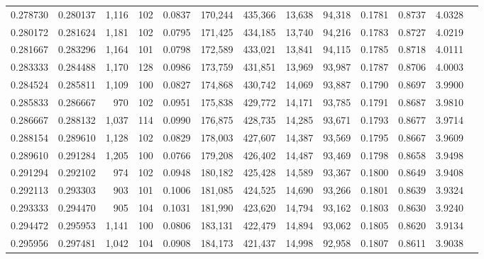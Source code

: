 \begin{tabular}{rrrrrrrrrrrrr}
0.278730 & 0.280137 &  1,116 &   102 &                                     0.0837 & 170,244 & 435,366 &  13,638 &  94,318 & 0.1781 & 0.8737 & 4.0328 \\
0.280172 & 0.281624 &  1,181 &   102 &                                     0.0795 & 171,425 & 434,185 &  13,740 &  94,216 & 0.1783 & 0.8727 & 4.0219 \\
0.281667 & 0.283296 &  1,164 &   101 &                                     0.0798 & 172,589 & 433,021 &  13,841 &  94,115 & 0.1785 & 0.8718 & 4.0111 \\
0.283333 & 0.284488 &  1,170 &   128 &                                     0.0986 & 173,759 & 431,851 &  13,969 &  93,987 & 0.1787 & 0.8706 & 4.0003 \\
0.284524 & 0.285811 &  1,109 &   100 &                                     0.0827 & 174,868 & 430,742 &  14,069 &  93,887 & 0.1790 & 0.8697 & 3.9900 \\
0.285833 & 0.286667 &    970 &   102 &                                     0.0951 & 175,838 & 429,772 &  14,171 &  93,785 & 0.1791 & 0.8687 & 3.9810 \\
0.286667 & 0.288132 &  1,037 &   114 &                                     0.0990 & 176,875 & 428,735 &  14,285 &  93,671 & 0.1793 & 0.8677 & 3.9714 \\
0.288154 & 0.289610 &  1,128 &   102 &                                     0.0829 & 178,003 & 427,607 &  14,387 &  93,569 & 0.1795 & 0.8667 & 3.9609 \\
0.289610 & 0.291284 &  1,205 &   100 &                                     0.0766 & 179,208 & 426,402 &  14,487 &  93,469 & 0.1798 & 0.8658 & 3.9498 \\
0.291294 & 0.292102 &    974 &   102 &                                     0.0948 & 180,182 & 425,428 &  14,589 &  93,367 & 0.1800 & 0.8649 & 3.9408 \\
0.292113 & 0.293303 &    903 &   101 &                                     0.1006 & 181,085 & 424,525 &  14,690 &  93,266 & 0.1801 & 0.8639 & 3.9324 \\
0.293333 & 0.294470 &    905 &   104 &                                     0.1031 & 181,990 & 423,620 &  14,794 &  93,162 & 0.1803 & 0.8630 & 3.9240 \\
0.294472 & 0.295953 &  1,141 &   100 &                                     0.0806 & 183,131 & 422,479 &  14,894 &  93,062 & 0.1805 & 0.8620 & 3.9134 \\
0.295956 & 0.297481 &  1,042 &   104 &                                     0.0908 & 184,173 & 421,437 &  14,998 &  92,958 & 0.1807 & 0.8611 & 3.9038 \\

\end{tabular}
